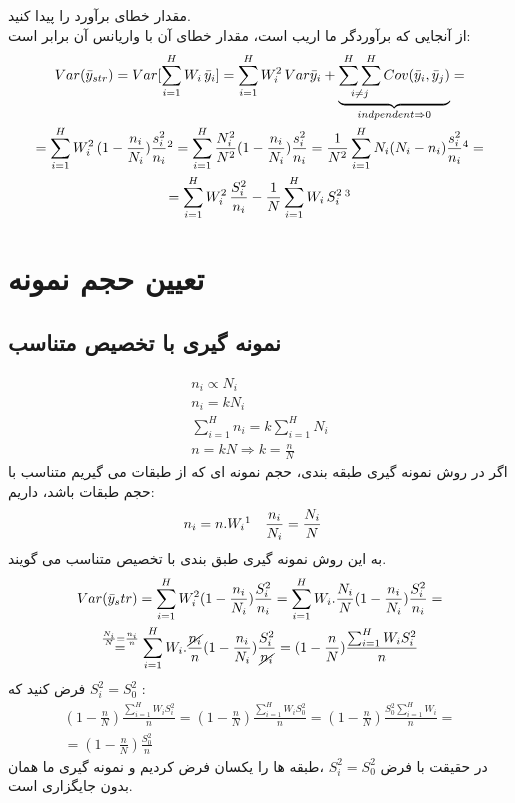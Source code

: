 مقدار خطای برآورد را پیدا کنید. 
\\
از آنجایی که برآوردگر ما اریب است، مقدار خطای آن با واریانس آن برابر است:
\begin{multline*}
	Var(\bar{y}_{str})
	=Var[\sum_{i=1}^{H}W_i\,\bar{y}_i]
	=\sum_{i=1}^{H}W_i^2\, Var{\bar{y}_i}+\underset{indpendent\Rightarrow 0}{\underbrace{\underset{i\neq j}{\sum^H\sum^H}\, Cov(\bar{y}_i,\bar{y}_j)}}
	=\\=
	\sum_{i=1}^{H}W_i^2\, (1-\frac{n_i}{N_i})\frac{s_i^2}{n_i}\footnotemark[2]
	=\sum_{i=1}^{H}\frac{N_i^2}{N^2}(1-\frac{n_i}{N_i})\frac{s_i^2}{n_i}
	=\frac{1}{N^2}\sum_{i=1}^{H}N_i(N_i-n_i)\frac{s_i^2}{n_i}\footnotemark[4]
	=\\=
	\sum_{i=1}^{H}W_i^2\, \frac{S_i^2}{n_i}-\frac{1}{N}\sum_{i=1}^{H}W_i\, S_i^{2}\,\footnotemark[3]
\end{multline*}
\section*{تعیین حجم نمونه }
\subsection*{نمونه گیری با تخصیص متناسب}
\begin{gather*}
	n_i\varpropto N_i \\
	n_i=kN_i \\
	\sum_{i=1}^{H}n_i=k\sum_{i=1}^{H}N_i \\
	n=kN \Rightarrow k=\frac{n}{N}
\end{gather*}
اگر در روش نمونه گیری طبقه بندی، حجم نمونه ای که از طبقات می گیریم متناسب با حجم طبقات باشد، داریم:
\begin{align*}
	n_i&=n.W_i\footnotemark & \frac{n_i}{N_i}&=\frac{N_i}{N}
\end{align*}
به این روش نمونه گیری طبق بندی با تخصیص متناسب می گویند.
\begin{multline*}
	Var(\bar{y}_str)=\sum_{i=1}^{H}W_i^2(1-\frac{n_i}{N_i})\frac{S_i^2}{n_i}=
	\sum_{i=1}^{H}W_i.\frac{N_i}{N}(1-\frac{n_i}{N_i})\frac{S_i^2}{n_i}
	=\\ \overset{\frac{N_i}{N}=\frac{n_i}{n}}{=}
	\sum_{i=1}^{H}W_i.\frac{\cancel{n_i}}{n}(1-\frac{n_i}{N_i})\frac{S_i^2}{\cancel{n_i}}
	=(1-\frac{n}{N})\frac{\sum_{i=1}^{H}W_iS_i^2}{n}
\end{multline*}
فرض کنید که 
$S_i^2=S_0^2$
:
\begin{gather*}
	(1-\frac{n}{N})\frac{\sum_{i=1}^{H}W_iS_i^2}{n}=(1-\frac{n}{N})\frac{\sum_{i=1}^{H}W_iS_0^2}{n}
	=(1-\frac{n}{N})\frac{S_0^2\sum_{i=1}^{H}W_i}{n}
	=\\=
	(1-\frac{n}{N})\frac{S_0^2}{n}
\end{gather*}
در حقیقت با فرض 
$S_i^2=S_0^2$
،طبقه ها را یکسان فرض کردیم و نمونه گیری ما همان 
بدون جایگزاری است.
